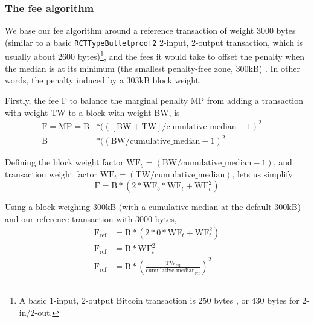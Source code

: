 \subsubsection*{The fee algorithm}

We base our fee algorithm around a reference transaction \cite{jollymore-old-analysis} of weight 3000 bytes (similar to a basic {\tt RCTTypeBulletproof2} 2-input, 2-output transaction, which is usually about 2600 bytes)\footnote{A basic 1-input, 2-output Bitcoin transaction is 250 bytes \cite{bitcoin-txsizes-2015}, or 430 bytes for 2-in/2-out.}, and the fees it would take to offset the penalty when the median is at its minimum (the smallest penalty-free zone, 300kB) \cite{articmine-36c3-dynamics}. In other words, the penalty induced by a 303kB block weight.%

Firstly, the fee F to balance the marginal penalty MP from adding a transaction with weight TW to a block with weight BW, is\vspace{.175cm}
\begin{align*}
    \textrm{F} = \textrm{MP} = \textrm{B}&*(([\textrm{BW} + \textrm{TW}]/\textrm{cumulative\_median} - 1)^2 -\\ \textrm{B}&*((\textrm{BW}/\textrm{cumulative\_median} - 1)^2
\end{align*}{}

Defining the block weight factor $\textrm{WF}_b = (\textrm{BW}/\textrm{cumulative\_median} - 1)$, and transaction weight factor $\textrm{WF}_t = (\textrm{TW}/\textrm{cumulative\_median})$, lets us simplify\vspace{.175cm}
\[\textrm{F} = \textrm{B}*(2*\textrm{WF}_b*\textrm{WF}_t + \textrm{WF}_t^2)\]

Using a block weighing 300kB (with a cumulative median at the default 300kB) and our reference transaction with 3000 bytes,
\begin{align*}
    \textrm{F}_{\textrm{ref}} &= \textrm{B}*(2*0*\textrm{WF}_t + \textrm{WF}_t^2)\\
    \textrm{F}_{\textrm{ref}} &= \textrm{B}*\textrm{WF}_t^2\\
    \textrm{F}_{\textrm{ref}} &= \textrm{B}*(\frac{\textrm{TW}_{\textrm{ref}}}{\textrm{cumulative\_median}_{\textrm{ref}}})^2
\end{align*}{}

